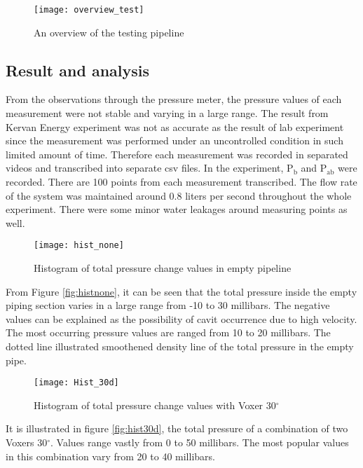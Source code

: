 \begin{figure}[b]
  \centering
  \texttt{[image: overview\_test]}
  \caption{ An overview of the testing pipeline}
  \label{fig:overview}
\end{figure}

\subsection{Result and analysis}

From the observations through the pressure meter, the pressure values of each measurement were not stable and varying in a large range. The result from Kervan Energy experiment was not as accurate as the result of lab experiment since the measurement was performed under an uncontrolled condition in such limited amount of time. Therefore each measurement was recorded in separated videos and transcribed into separate \gls{csv} files. In the experiment, P$_{\text{b}}$ and P$_{\text{ab}}$ were recorded. There are 100 points from each measurement transcribed. The flow rate of the system was maintained around 0.8 liters per second throughout the whole experiment. There were some minor water leakages around measuring points as well.

\begin{figure}[h]
  \centering
  \texttt{[image: hist\_none]}
  \caption{ Histogram of total pressure change values in empty pipeline}
  \label{fig:histnone}
\end{figure}

From Figure \vref{fig:histnone}, it can be seen that the total pressure inside the empty piping section varies in a large range from -10 to 30 millibars. The negative values can be explained as the possibility of \gls{cavit} occurrence due to high velocity. The most occurring pressure values are ranged from 10 to 20 millibars. The dotted line illustrated smoothened density line of the total pressure in the empty pipe. 
\newpage

\begin{figure}[t]
  \centering
  \texttt{[image: Hist\_30d]}
  \caption{ Histogram of total pressure change values with Voxer 30$^{\circ}$}
  \label{fig:hist30d}
\end{figure}

It is illustrated in figure \vref{fig:hist30d}, the total pressure of a combination of two Voxers 30$^{\circ}$. Values range vastly from 0 to 50 millibars. The most popular values in this combination vary from 20 to 40 millibars.

